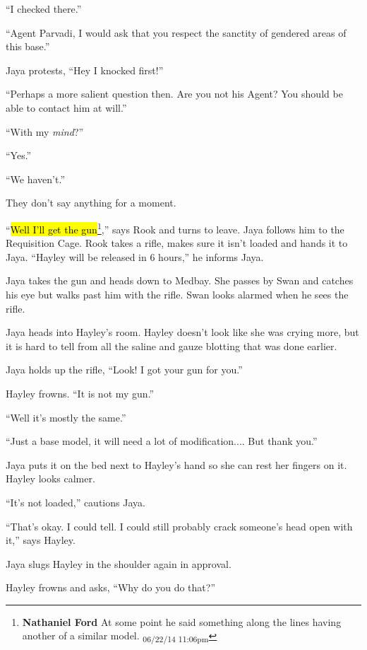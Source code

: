 ``I checked there.''

``Agent Parvadi, I would ask that you respect the sanctity of gendered areas of this base.''

Jaya protests, ``Hey I knocked first!''

``Perhaps a more salient question then. Are you not his Agent?  You should be able to contact him at will.''

``With my \textit{mind}?''

``Yes.''

``We haven't.''

They don't say anything for a moment.

``\hl{Well I'll get the gun}\footnote{\textbf{Nathaniel Ford }At some point he said something along the lines having another of a similar model. \textsubscript{06/22/14 11:06pm}},'' says Rook and turns to leave.  Jaya follows him to the Requisition Cage.  Rook takes a rifle, makes sure it isn't loaded and hands it to Jaya.  ``Hayley will be released in 6 hours,'' he informs Jaya.





Jaya takes the gun and heads down to Medbay.  She passes by Swan and catches his eye but walks past him with the rifle.  Swan looks alarmed when he sees the rifle.



Jaya heads into Hayley's room.  Hayley doesn't look like she was crying more, but it is hard to tell from all the saline and gauze blotting that was done earlier.

Jaya holds up the rifle, ``Look!  I got your gun for you.''

Hayley frowns.  ``It is not my gun.''

``Well it's mostly the same.''

``Just a base model, it will need a lot of modification.... But thank you.''

Jaya puts it on the bed next to Hayley's hand so she can rest her fingers on it.  Hayley looks calmer.  

``It's not loaded,'' cautions Jaya.

``That's okay.  I could tell.   I could still probably crack someone's head open with it,'' says Hayley.

Jaya slugs Hayley in the shoulder again in approval.

Hayley frowns and asks, ``Why do you do that?''

